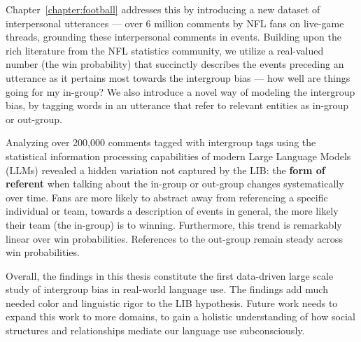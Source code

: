 Chapter~\ref{chapter:football} addresses this by introducing a new dataset of interpersonal utterances --- over 6 million comments by NFL fans on live-game threads, grounding these interpersonal comments in events. Building upon the rich literature from the NFL statistics community, we utilize a real-valued number (the win probability) that succinctly describes the events preceding an utterance as it pertains most towards the intergroup bias --- how well are things going for my in-group? We also introduce a novel way of modeling the intergroup bias, by tagging words in an utterance that refer to relevant entities as in-group or out-group. 

Analyzing over 200,000 comments tagged with intergroup tags using the statistical information processing capabilities of modern Large Language Models (LLMs) revealed a hidden variation not captured by the LIB: the \textbf{form of referent} when talking about the in-group or out-group changes systematically over time. Fans are more likely to abstract away from referencing a specific individual or team, towards a description of events in general, the more likely their team (the in-group) is to winning. Furthermore, this trend is remarkably linear over win probabilities. References to the out-group remain steady across win probabilities.

Overall, the findings in this thesis constitute the first data-driven large scale study of intergroup bias in real-world language use. The findings add much needed color and linguistic rigor to the LIB hypothesis. Future work needs to expand this work to more domains, to gain a holistic understanding of how social structures and relationships mediate our language use subconsciously.
